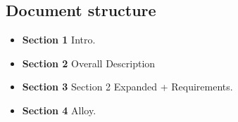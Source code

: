 \documentclass[table, 12pt]{article} %
\begin{document}
    \subsection{Document structure}
        \begin{itemize}
            \item \textbf{Section 1} Intro.
            \item \textbf{Section 2} Overall Description
            \item \textbf{Section 3} Section 2 Expanded + Requirements.
            \item \textbf{Section 4} Alloy.
        \end{itemize}

    \newpage
\end{document}
